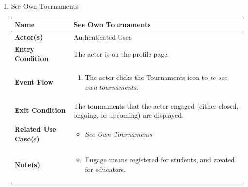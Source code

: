 \begin{enumerate}
\item See Own Tournaments
\begin{center}
    \begin{tabular}{ | m{10em} | m{10cm}| } 
      \hline
      \textbf{Name} & See Own Tournaments  \\ 
      \hline
      \textbf{Actor(s)} & Authenticated User \\ 
      \hline
      \textbf{Entry Condition} & The actor is on the profile page. \\ 
      \hline
      \textbf{Event Flow} & 
          \begin{enumerate}[(1)]
              \item The actor clicks the Tournaments icon to \textit{to see own tournaments}.
          \end{enumerate}
      \\ 
      \hline
      \textbf{Exit Condition} & The tournaments that the actor engaged (either closed, ongoing, or upcoming) are displayed.  \\ 
      \hline
      \textbf{Related Use Case(s)} & 
      \begin{itemize}
          \item \textit{See Own Tournaments}
      \end{itemize}
          \\ 
      \hline
      \textbf{Note(s)} & 
      \begin{itemize}
          \item Engage means registered for students, and created for educators.
      \end{itemize}
          \\ 
      \hline
    \end{tabular}
\end{center}


\end{enumerate}
